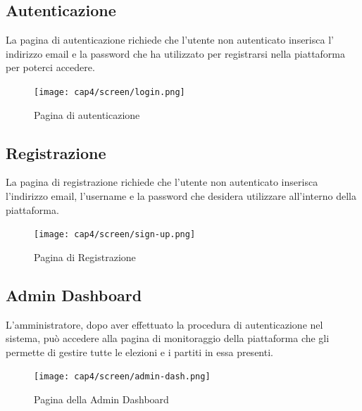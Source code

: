 \subsection{Autenticazione}
La pagina di autenticazione richiede che l'utente non autenticato inserisca l' indirizzo email e la password che ha utilizzato per registrarsi nella piattaforma per poterci accedere.
\begin{figure}[H] 
    \centering 
    \texttt{[image: cap4/screen/login.png]} 
    \caption{Pagina di autenticazione}
\end{figure}

\subsection{Registrazione}
La pagina di registrazione richiede che l'utente non autenticato inserisca l'indirizzo email, l'username e la password che desidera utilizzare all'interno della piattaforma.
\begin{figure}[H] 
    \centering 
    \texttt{[image: cap4/screen/sign-up.png]} 
    \caption{Pagina di Registrazione}
\end{figure}

\subsection{Admin Dashboard}
L'amministratore, dopo aver effettuato la procedura di autenticazione nel sistema, può accedere alla pagina di monitoraggio della piattaforma che gli permette di gestire tutte le elezioni e i partiti in essa presenti.
\begin{figure}[H] 
    \centering 
    \texttt{[image: cap4/screen/admin-dash.png]} 
    \caption{Pagina della Admin Dashboard}
\end{figure}


